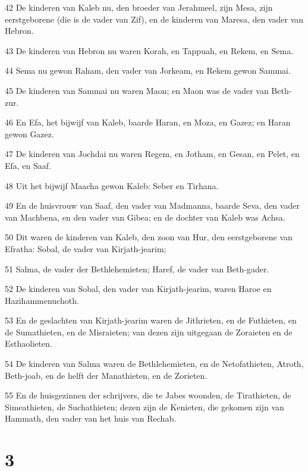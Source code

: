 \par 42 De kinderen van Kaleb nu, den broeder van Jerahmeel, zijn Mesa, zijn eerstgeborene (die is de vader van Zif), en de kinderen van Maresa, den vader van Hebron.
\par 43 De kinderen van Hebron nu waren Korah, en Tappuah, en Rekem, en Sema.
\par 44 Sema nu gewon Raham, den vader van Jorkeam, en Rekem gewon Sammai.
\par 45 De kinderen van Sammai nu waren Maon; en Maon was de vader van Beth-zur.
\par 46 En Efa, het bijwijf van Kaleb, baarde Haran, en Moza, en Gazez; en Haran gewon Gazez.
\par 47 De kinderen van Jochdai nu waren Regem, en Jotham, en Gesan, en Pelet, en Efa, en Saaf.
\par 48 Uit het bijwijf Maacha gewon Kaleb: Seber en Tirhana.
\par 49 En de huisvrouw van Saaf, den vader van Madmanna, baarde Seva, den vader van Machbena, en den vader van Gibea; en de dochter van Kaleb was Achsa.
\par 50 Dit waren de kinderen van Kaleb, den zoon van Hur, den eerstgeborene van Efratha: Sobal, de vader van Kirjath-jearim;
\par 51 Salma, de vader der Bethlehemieten; Haref, de vader van Beth-gader.
\par 52 De kinderen van Sobal, den vader van Kirjath-jearim, waren Haroe en Hazihammenuchoth.
\par 53 En de geslachten van Kirjath-jearim waren de Jithrieten, en de Futhieten, en de Sumathieten, en de Misraieten; van dezen zijn uitgegaan de Zoraieten en de Esthaolieten.
\par 54 De kinderen van Salma waren de Bethlehemieten, en de Netofathieten, Atroth, Beth-joab, en de helft der Manathieten, en de Zorieten.
\par 55 En de huisgezinnen der schrijvers, die te Jabes woonden, de Tirathieten, de Simeathieten, de Suchathieten; dezen zijn de Kenieten, die gekomen zijn van Hammath, den vader van het huis van Rechab.

\chapter{3}

